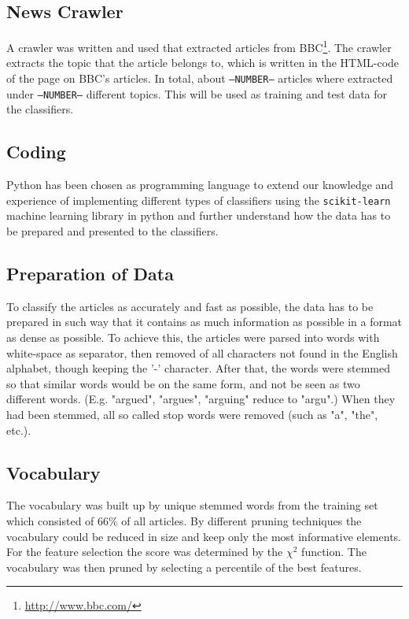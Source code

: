 \subsection{News Crawler}
A crawler was written and used that extracted articles from BBC\footnote{\url{http://www.bbc.com/}}. The crawler extracts the topic that the article belongs to, which is written in the HTML-code of the page on BBC's articles. In total, about \texttt{--NUMBER--} articles where extracted under \texttt{--NUMBER--} different topics. This will be used as training and test data for the classifiers.
\subsection{Coding}
Python has been chosen as programming language to extend our knowledge and experience of implementing different types of classifiers using the \texttt{scikit-learn} machine learning library in python and further understand how the data has to be prepared and presented to the classifiers.
\subsection{Preparation of Data}
To classify the articles as accurately and fast as possible, the data has to be prepared in such way that it contains as much information as possible in a format as dense as possible. To achieve this, the articles were parsed into words with white-space as separator, then removed of all characters not found in the English alphabet, though keeping the '-' character. After that, the words were stemmed so that similar words would be on the same form, and not be seen as two different words. (E.g. "argued", "argues", "arguing" reduce to "argu".) When they had been stemmed, all so called stop words were removed (such as "a", "the", etc.). 
\subsection{Vocabulary}
The vocabulary was built up by unique stemmed words from the training set which consisted of 66\% of all articles. By different pruning techniques the vocabulary could be reduced in size and keep only the most informative elements. For the feature selection the score was determined by the $\chi^2$ function. The vocabulary was then pruned by selecting a percentile of the best features.
